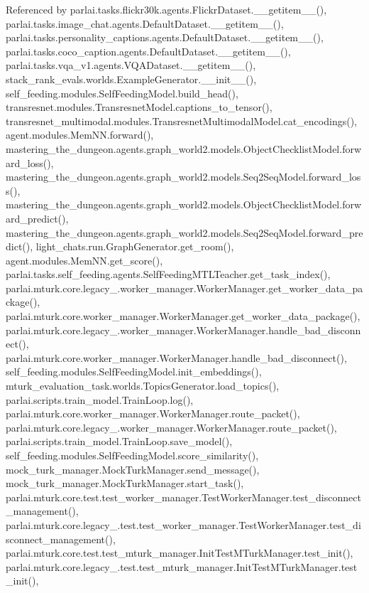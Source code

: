 Referenced by parlai.\+tasks.\+flickr30k.\+agents.\+Flickr\+Dataset.\+\_\+\+\_\+getitem\+\_\+\+\_\+(), parlai.\+tasks.\+image\+\_\+chat.\+agents.\+Default\+Dataset.\+\_\+\+\_\+getitem\+\_\+\+\_\+(), parlai.\+tasks.\+personality\+\_\+captions.\+agents.\+Default\+Dataset.\+\_\+\+\_\+getitem\+\_\+\+\_\+(), parlai.\+tasks.\+coco\+\_\+caption.\+agents.\+Default\+Dataset.\+\_\+\+\_\+getitem\+\_\+\+\_\+(), parlai.\+tasks.\+vqa\+\_\+v1.\+agents.\+V\+Q\+A\+Dataset.\+\_\+\+\_\+getitem\+\_\+\+\_\+(), stack\+\_\+rank\+\_\+evals.\+worlds.\+Example\+Generator.\+\_\+\+\_\+init\+\_\+\+\_\+(), self\+\_\+feeding.\+modules.\+Self\+Feeding\+Model.\+build\+\_\+head(), transresnet.\+modules.\+Transresnet\+Model.\+captions\+\_\+to\+\_\+tensor(), transresnet\+\_\+multimodal.\+modules.\+Transresnet\+Multimodal\+Model.\+cat\+\_\+encodings(), agent.\+modules.\+Mem\+N\+N.\+forward(), mastering\+\_\+the\+\_\+dungeon.\+agents.\+graph\+\_\+world2.\+models.\+Object\+Checklist\+Model.\+forward\+\_\+loss(), mastering\+\_\+the\+\_\+dungeon.\+agents.\+graph\+\_\+world2.\+models.\+Seq2\+Seq\+Model.\+forward\+\_\+loss(), mastering\+\_\+the\+\_\+dungeon.\+agents.\+graph\+\_\+world2.\+models.\+Object\+Checklist\+Model.\+forward\+\_\+predict(), mastering\+\_\+the\+\_\+dungeon.\+agents.\+graph\+\_\+world2.\+models.\+Seq2\+Seq\+Model.\+forward\+\_\+predict(), light\+\_\+chats.\+run.\+Graph\+Generator.\+get\+\_\+room(), agent.\+modules.\+Mem\+N\+N.\+get\+\_\+score(), parlai.\+tasks.\+self\+\_\+feeding.\+agents.\+Self\+Feeding\+M\+T\+L\+Teacher.\+get\+\_\+task\+\_\+index(), parlai.\+mturk.\+core.\+legacy\+\_.\+worker\+\_\+manager.\+Worker\+Manager.\+get\+\_\+worker\+\_\+data\+\_\+package(), parlai.\+mturk.\+core.\+worker\+\_\+manager.\+Worker\+Manager.\+get\+\_\+worker\+\_\+data\+\_\+package(), parlai.\+mturk.\+core.\+legacy\+\_.\+worker\+\_\+manager.\+Worker\+Manager.\+handle\+\_\+bad\+\_\+disconnect(), parlai.\+mturk.\+core.\+worker\+\_\+manager.\+Worker\+Manager.\+handle\+\_\+bad\+\_\+disconnect(), self\+\_\+feeding.\+modules.\+Self\+Feeding\+Model.\+init\+\_\+embeddings(), mturk\+\_\+evaluation\+\_\+task.\+worlds.\+Topics\+Generator.\+load\+\_\+topics(), parlai.\+scripts.\+train\+\_\+model.\+Train\+Loop.\+log(), parlai.\+mturk.\+core.\+worker\+\_\+manager.\+Worker\+Manager.\+route\+\_\+packet(), parlai.\+mturk.\+core.\+legacy\+\_.\+worker\+\_\+manager.\+Worker\+Manager.\+route\+\_\+packet(), parlai.\+scripts.\+train\+\_\+model.\+Train\+Loop.\+save\+\_\+model(), self\+\_\+feeding.\+modules.\+Self\+Feeding\+Model.\+score\+\_\+similarity(), mock\+\_\+turk\+\_\+manager.\+Mock\+Turk\+Manager.\+send\+\_\+message(), mock\+\_\+turk\+\_\+manager.\+Mock\+Turk\+Manager.\+start\+\_\+task(), parlai.\+mturk.\+core.\+test.\+test\+\_\+worker\+\_\+manager.\+Test\+Worker\+Manager.\+test\+\_\+disconnect\+\_\+management(), parlai.\+mturk.\+core.\+legacy\+\_.\+test.\+test\+\_\+worker\+\_\+manager.\+Test\+Worker\+Manager.\+test\+\_\+disconnect\+\_\+management(), parlai.\+mturk.\+core.\+test.\+test\+\_\+mturk\+\_\+manager.\+Init\+Test\+M\+Turk\+Manager.\+test\+\_\+init(), parlai.\+mturk.\+core.\+legacy\+\_.\+test.\+test\+\_\+mturk\+\_\+manager.\+Init\+Test\+M\+Turk\+Manager.\+test\+\_\+init(), 